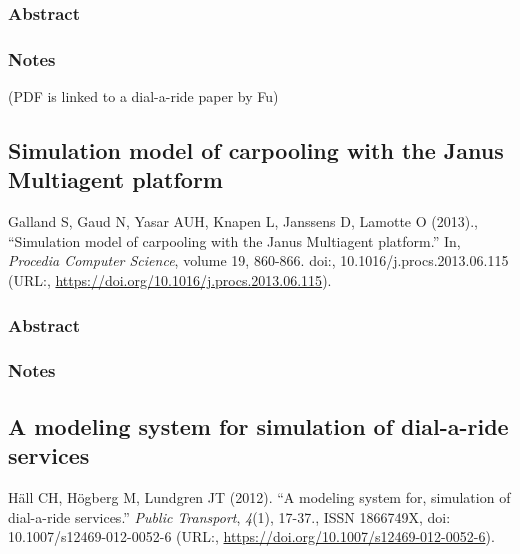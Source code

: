 \documentclass[
]{article}
\begin{document}
\hypertarget{abstract-19}{%
\subsubsection{Abstract}\label{abstract-19}}

\hypertarget{notes-19}{%
\subsubsection{Notes}\label{notes-19}}

(PDF is linked to a dial-a-ride paper by Fu)

\hypertarget{simulation-model-of-carpooling-with-the-janus-multiagent-platform}{%
\subsection{Simulation model of carpooling with the Janus Multiagent
platform}\label{simulation-model-of-carpooling-with-the-janus-multiagent-platform}}

Galland S, Gaud N, Yasar AUH, Knapen L, Janssens D, Lamotte O (2013).,
``Simulation model of carpooling with the Janus Multiagent platform.''
In, \emph{Procedia Computer Science}, volume 19, 860-866. doi:,
10.1016/j.procs.2013.06.115 (URL:,
\url{https://doi.org/10.1016/j.procs.2013.06.115}).

\hypertarget{abstract-20}{%
\subsubsection{Abstract}\label{abstract-20}}

\hypertarget{notes-20}{%
\subsubsection{Notes}\label{notes-20}}

\hypertarget{a-modeling-system-for-simulation-of-dial-a-ride-services}{%
\subsection{A modeling system for simulation of dial-a-ride
services}\label{a-modeling-system-for-simulation-of-dial-a-ride-services}}

Häll CH, Högberg M, Lundgren JT (2012). ``A modeling system for,
simulation of dial-a-ride services.'' \emph{Public Transport},
\emph{4}(1), 17-37., ISSN 1866749X, doi: 10.1007/s12469-012-0052-6
(URL:, \url{https://doi.org/10.1007/s12469-012-0052-6}).
\end{document}
